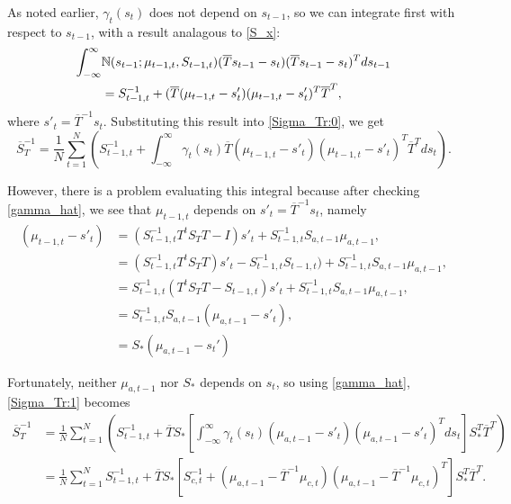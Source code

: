 \documentclass[12pt,leqno]{article}
\begin{document}
As noted earlier, $\gamma_t(s_t)$ does not depend on $s_{t-1}$, so we can integrate first with respect to $s_{t-1}$, with
a result analagous to \eqref{S_x}:
\begin{align*}
  \int_{-\infty}^{\infty}&{\mathbb N}(s_{t-1};\mu_{t-1,t},S_{t-1,t})(\overline{T}s_{t-1}-s_t)
  (\overline{T}s_{t-1}-s_t)^Tds_{t-1}\\ &= S_{t-1,t}^{-1} +
(\overline{T}(\mu_{t-1,t}-s'_t)(\mu_{t-1,t}-s'_t)^T\overline{T}^T,
\end{align*}
where $s'_t = \overline{T}^{-1}s_t$.
Substituting this result into \eqref{Sigma_Tr:0}, we get
\begin{equation}\label{Sigma_Tr:1}
  \overline{S}_T^{-1} =  \frac{1}{N}\sum_{t=1}^N\left(S_{t-1,t}^{-1} +\int_{-\infty}^{\infty}\gamma_t(s_t)
  \overline{T}(\mu_{t-1,t}-s'_t)(\mu_{t-1,t}-s'_t)^T\overline{T}^Tds_t\right).
\end{equation}

However, there is a problem evaluating this integral because after checking \eqref{gamma_hat}, we see that $\mu_{t-1,t}$
depends on $s'_t = \overline{T}^{-1}s_t$, namely 
\begin{equation}\label{s-mu_1}
  \begin{split}
    \left(\mu_{t-1,t}-s'_t\right) &= (S_{t-1,t}^{-1}T^{t}S_TT - I)s'_t + S_{t-1,t}^{-1}S_{a,t-1}\mu_{a,t-1}, \\
    &= (S_{t-1,t}^{-1}T^{t}S_TT)s'_t - S_{t-1,t}^{-1}S_{t-1,t}) + S_{t-1,t}^{-1}S_{a,t-1}\mu_{a,t-1}, \\
    &= S_{t-1,t}^{-1}(T^{t}S_TT - S_{t-1,t} )s'_t + S_{t-1,t}^{-1}S_{a,t-1}\mu_{a,t-1}, \\
    &= S_{t-1,t}^{-1}S_{a,t-1}(\mu_{a,t-1}-s'_t),\\
    &= S_*(\mu_{a,t-1}-s_t')
  \end{split}
\end{equation}

Fortunately, neither $\mu_{a,t-1}$ nor $S_*$ depends on $s_t$,
so using \eqref{gamma_hat}, \eqref{Sigma_Tr:1} becomes
\begin{equation}\label{S_Tr:2}
  \begin{split}
  \overline{S}_T^{-1} &=\frac{1}{N}\sum_{t=1}^N\left(S_{t-1,t}^{-1} + \overline{T}S_*
  \left[\int_{-\infty}^{\infty}\gamma_t(s_t)(\mu_{a,t-1}-s'_t)(\mu_{a,t-1}-s'_t)^Tds_t\right]S_*^T\overline{T}^T\right)\\
   &=\frac{1}{N}\sum_{t=1}^NS_{t-1,t}^{-1} + \overline{T}S_*
           [S_{c,t}^{-1}+(\mu_{a,t-1}-\overline{T}^{-1}\mu_{c,t})(\mu_{a,t-1}-\overline{T}^{-1}\mu_{c,t})^T]
           S_*^T\overline{T}^T.
  \end{split}
\end{equation}
\newpage
\end{document}
